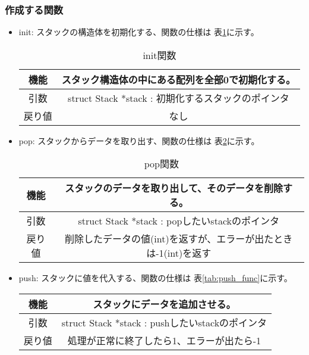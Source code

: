 \documentclass[a4paper,11pt]{jsarticle}
\begin{document}
\subsubsection{作成する関数}
\begin{itemize}
  \item init: スタックの構造体を初期化する、関数の仕様は 表\ref{tab:init_func}に示す。
        \begin{table}[ht]
          \centering
          \begin{tabular}{|c|c|}
            \hline
            機能  & スタック構造体の中にある配列を全部0で初期化する。            \\
            \hline
            引数  & struct Stack *stack : 初期化するスタックのポインタ \\
            \hline
            戻り値 & なし                                   \\
            \hline
          \end{tabular}
          \caption{init関数}
          \label{tab:init_func}
        \end{table}
  \item pop: スタックからデータを取り出す、関数の仕様は 表\ref{tab:pop_func}に示す。
  \begin{table}[ht]
    \centering
    \begin{tabular}{|c|c|}
      \hline
      機能  & スタックのデータを取り出して、そのデータを削除する。            \\
      \hline
      引数  & struct Stack *stack : popしたいstackのポインタ \\
      \hline
      戻り値 & 削除したデータの値(int)を返すが、エラーが出たときは-1(int)を返す                               \\
      \hline
    \end{tabular}
    \caption{pop関数}
    \label{tab:pop_func}
  \end{table}
  \item push: スタックに値を代入する、関数の仕様は 表\ref{tab:push_func}に示す。
  \begin{table}[ht]
    \centering
    \begin{tabular}{|c|c|}
      \hline
      機能  & スタックにデータを追加させる。            \\
      \hline
      引数  & struct Stack *stack : pushしたいstackのポインタ \\
      \hline
      戻り値 & 処理が正常に終了したら1、エラーが出たら-1                               \\

\end{tabular}
\end{table}
\end{itemize}
\end{document}
